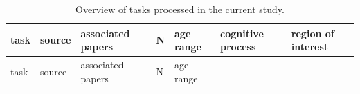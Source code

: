 \documentclass[
  letterpaper,
  DIV=11,
  numbers=noendperiod]{scrartcl}
\begin{document}
\begin{longtable}[]{@{}
  >{\raggedright\arraybackslash}p{}
  >{\raggedright\arraybackslash}p{}
  >{\raggedright\arraybackslash}p{}
  >{\raggedright\arraybackslash}p{}
  >{\raggedright\arraybackslash}p{}
  >{\raggedright\arraybackslash}p{}
  >{\raggedright\arraybackslash}p{}@{}}
\caption{Overview of tasks processed in the current
study.}\label{tbl-1}\tabularnewline
\toprule\noalign{}
\begin{minipage}[b]{\linewidth}\raggedright
task
\end{minipage} & \begin{minipage}[b]{\linewidth}\raggedright
source
\end{minipage} & \begin{minipage}[b]{\linewidth}\raggedright
associated papers
\end{minipage} & \begin{minipage}[b]{\linewidth}\raggedright
N
\end{minipage} & \begin{minipage}[b]{\linewidth}\raggedright
age range
\end{minipage} & \begin{minipage}[b]{\linewidth}\raggedright
cognitive process
\end{minipage} & \begin{minipage}[b]{\linewidth}\raggedright
region of interest
\end{minipage} \\
\midrule\noalign{}
\endfirsthead
\toprule\noalign{}
\begin{minipage}[b]{\linewidth}\raggedright
task
\end{minipage} & \begin{minipage}[b]{\linewidth}\raggedright
source
\end{minipage} & \begin{minipage}[b]{\linewidth}\raggedright
associated papers
\end{minipage} & \begin{minipage}[b]{\linewidth}\raggedright
N
\end{minipage} & \begin{minipage}[b]{\linewidth}\raggedright
age range
\end{minipage} & \begin{minipage}[b]{\linewidth}\raggedright

\end{minipage}
\end{longtable}
\end{document}
